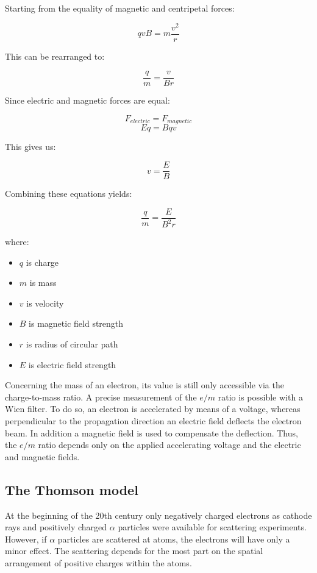 \documentclass[
  a4paper,
]{book}
\providecommand{\tightlist}{%
  \setlength{\itemsep}{0pt}\setlength{\parskip}{0pt}}
\begin{document}
\begin{tcolorbox}
Starting from the equality of magnetic and centripetal forces:

\[qvB = m\frac{v^2}{r}\]

This can be rearranged to:

\[\frac{q}{m} = \frac{v}{Br}\]

Since electric and magnetic forces are equal:

\[F_{electric} = F_{magnetic}\] \[Eq = Bqv\]

This gives us:

\[v = \frac{E}{B}\]

Combining these equations yields:

\[\frac{q}{m} = \frac{E}{B^2r}\]

where:

\begin{itemize}
\tightlist
\item
  \(q\) is charge
\item
  \(m\) is mass
\item
  \(v\) is velocity
\item
  \(B\) is magnetic field strength
\item
  \(r\) is radius of circular path
\item
  \(E\) is electric field strength
\end{itemize}

\end{tcolorbox}

Concerning the mass of an electron, its value is still only accessible
via the charge-to-mass ratio. A precise measurement of the \(e/m\) ratio
is possible with a Wien filter. To do so, an electron is accelerated by
means of a voltage, whereas perpendicular to the propagation direction
an electric field deflects the electron beam. In addition a magnetic
field is used to compensate the deflection. Thus, the \(e/m\) ratio
depends only on the applied accelerating voltage and the electric and
magnetic fields.

\subsection{The Thomson model}\label{the-thomson-model}

At the beginning of the 20th century only negatively charged electrons
as cathode rays and positively charged \(\alpha\) particles were
available for scattering experiments. However, if \(\alpha\) particles
are scattered at atoms, the electrons will have only a minor effect. The
scattering depends for the most part on the spatial arrangement of
positive charges within the atoms.
\end{document}
